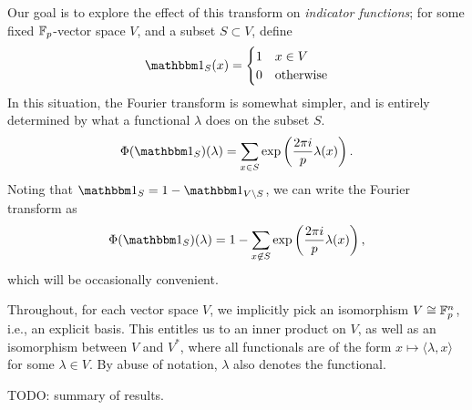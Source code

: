 Our goal is to explore the effect of this transform on \emph{indicator functions}; for
some fixed $\mathbb{F}_p$-vector space $V$, and a subset $S\subset V$, define
\[ \IND_S(x) = \begin{cases}
    1 & x \in V \\
    0 & \text{otherwise}     
\end{cases} \]
In this situation, the Fourier transform is somewhat simpler, and is entirely
determined by what a functional $\lambda$ does on the subset $S$.
\[ \Phi(\IND_S)(\lambda) = \sum_{x\in S} \exp \left(\frac{2\pi i}{p} \lambda(x)\right). \]
Noting that $\IND_S = 1 - \IND_{V\setminus S}$, we can write the Fourier transform as
\[ \Phi(\IND_S)(\lambda) = 1 - \sum_{x\not\in S} \exp \left(\frac{2\pi i}{p} \lambda(x)\right), \]
which will be occasionally convenient. 

\begin{rem}
    Throughout, for each vector space $V$, we implicitly pick an isomorphism 
    $V\cong\mathbb{F}_p^n$, i.e., an explicit basis. This
    entitles us to an inner product on $V$, as well as an isomorphism between $V$ and
    $V^*$, where all functionals are of the form $x \mapsto \langle \lambda, x \rangle$
    for some $\lambda\in V$. By abuse of notation, $\lambda$ also denotes the functional.
\end{rem}

TODO: summary of results.